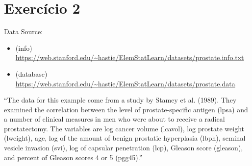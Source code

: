 \section{Exercício 2}

Data Source:
\begin{itemize}
    \item (info) \url{https://web.stanford.edu/~hastie/ElemStatLearn/datasets/prostate.info.txt}
    \item (database) \url{https://web.stanford.edu/~hastie/ElemStatLearn/datasets/prostate.data}
\end{itemize}

“The data for this example come from a study by Stamey et al. (1989). They examined the correlation between the level of prostate-specific antigen (lpsa) and a number of clinical measures in men who were about to receive a radical prostatectomy. The variables are log cancer volume (lcavol), log prostate weight (lweight), age, log of the amount of benign prostatic hyperplasia (lbph), seminal vesicle invasion (svi), log of capsular penetration (lcp), Gleason score (gleason), and percent of Gleason scores 4 or 5 (pgg45).”


